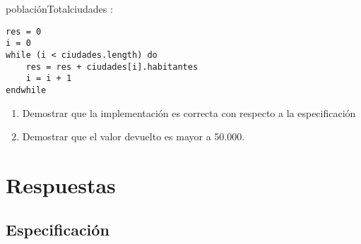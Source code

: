 \documentclass[10pt,a4paper]{article}
\begin{document}
\begin{proc} {poblaci\'onTotal}{\In ciudades : }{\ent}
{
}
\end{proc}


\begin{lstlisting}
res = 0
i = 0
while (i < ciudades.length) do
    res = res + ciudades[i].habitantes 
    i = i + 1
endwhile
\end{lstlisting}

    \begin{enumerate}
        \item Demostrar que la implementaci\'on es correcta con respecto a la especificaci\'on
        \item Demostrar que el valor devuelto es mayor a 50.000.
    \end{enumerate}




\section{Respuestas}

\subsection{Especificaci\'on}
\end{document}
